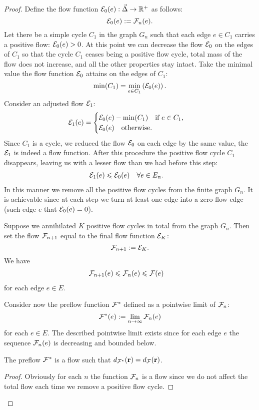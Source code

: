 \documentclass[12pt]{article}
\begin{document}
\begin{proof}
      Define the flow function $\cal{E}_0(e): \onet \to \mathbb{R}^{+}$ as follows:
      \[
        \cal{E}_0(e) := \flowposn{n}(e).
      \]
      Let there be a simple cycle $C_1$ in the graph $G_n$ such that each edge $e \in C_1$ carries
        a positive flow: $\cal{E}_0(e) > 0$.
      At this point we can decrease the flow $\cal{E}_0$ on the edges of $C_1$ so that the cycle $C_1$
        ceases being a positive flow cycle, total mass of the flow does not increase, and all the other properties stay intact.
      Take the minimal value the flow function $\cal{E}_0$ attains on the edges of $C_1$:
        \[
          \min(C_1) = \min_{e \in C_1}\left(\cal{E}_0(e)\right).
        \]
      Consider an adjusted flow $\cal{E}_1$:
      \begin{equation*}
        \cal{E}_1(e) =
        \begin{cases}
          \cal{E}_0(e) - \min(C_1) \quad \text{if } e \in C_1,\\
          \cal{E}_0(e) \quad \text{otherwise}.
        \end{cases}
      \end{equation*}
      Since $C_1$ is a cycle, we reduced the flow $\cal{E}_0$ on each edge by the same value,
        the $\cal{E}_1$ is indeed a flow function.
      After this procedure the positive flow cycle $C_1$ disappears,
        leaving us with a lesser flow than we had before this step:
      \begin{align*}
        &\cal{E}_1(e) \leq \cal{E}_0(e) \quad \forall e \in E_n.
      \end{align*}
      In this manner we remove all the positive flow cycles from the finite graph $G_n$.
      It is achievable since at each step we turn at least one edge into a zero-flow edge (such edge $e$ that $\cal{E}_0(e) = 0$).

      Suppose we annihilated $K$ positive flow cycles in total from the graph $G_n$.
      Then set the flow $\flowposn{n+1}$ equal to the final flow function $\cal{E}_K$:
      \[
        \flowposn{n+1} := \cal{E}_K.
      \]
      We have
      \begin{align*}
        &\flowposn{n+1}(e) \leq \flowposn{n}(e) \leq \flowpos(e)
      \end{align*}
        for each edge $e \in E$.

      Consider now the preflow function $\preflow$ defined as a pointwise limit of $\flowposn{n}$:
      \[
        \preflow(e) := \lim_{n \to \infty} \flowposn{n}(e)
      \]
        for each $e \in E$.
      The described pointwise limit exists since for each edge $e$ the sequence $\flowposn{n}(e)$ is decreasing and bounded below.
      \begin{prop}
        The preflow $\preflow$ is a flow such that $d_{\preflow}(\root) = d_{\flowpos}(\root)$.
      \end{prop}
      \begin{proof}
        Obviously for each $n$ the function $\flowposn{n}$ is a flow since we do not affect the total flow each time we remove a positive flow cycle.


\end{proof}
\end{proof}
\end{document}
